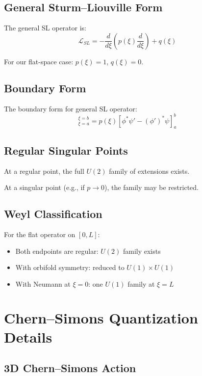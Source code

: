 \documentclass[11pt,a4paper]{article}
\theoremstyle{definition}
\theoremstyle{plain}
\theoremstyle{remark}
\begin{document}
\subsection{General Sturm--Liouville Form}

The general SL operator is:
\begin{equation}
\mathcal{L}_{SL} = -\frac{d}{d\xi}\left(p(\xi)\frac{d}{d\xi}\right) + q(\xi)
\label{eq:SL-general}
\end{equation}

For our flat-space case: $p(\xi) = 1$, $q(\xi) = 0$.

\subsection{Boundary Form}

The boundary form for general SL operator:
\begin{equation}
[\phi, \psi]_{\xi=a}^{\xi=b} = p(\xi)\left[\phi^*\psi' - (\phi')^*\psi\right]_a^b
\label{eq:boundary-form-SL}
\end{equation}

\subsection{Regular Singular Points}

At a regular point, the full $U(2)$ family of extensions exists.

At a singular point (e.g., if $p \to 0$), the family may be restricted.

\subsection{Weyl Classification}

For the flat operator on $[0, L]$:
\begin{itemize}
\item Both endpoints are regular: $U(2)$ family exists
\item With orbifold symmetry: reduced to $U(1) \times U(1)$
\item With Neumann at $\xi=0$: one $U(1)$ family at $\xi=L$
\end{itemize}

\section{Chern--Simons Quantization Details}
\label{app:CS}

\subsection{3D Chern--Simons Action}
\end{document}
